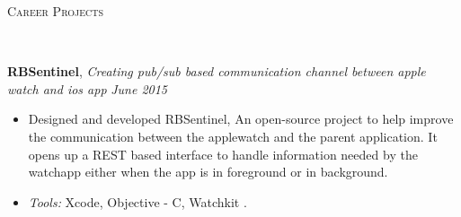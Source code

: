 \documentclass[9pt]{article}
\newenvironment{changemargin}[2]{%
  \begin{list}{}{%
    \setlength{\topsep}{0pt}%
    \setlength{\leftmargin}{#1}%
    \setlength{\rightmargin}{#2}%
    \setlength{\listparindent}{\parindent}%
    \setlength{\itemindent}{\parindent}%
    \setlength{\parsep}{\parskip}%
  }%
  \item[]}{\end{list}
}
\newcommand{\lineover}{
	\begin{changemargin}{-0.05in}{-0.05in}
		\vspace*{-8pt}
		\hrulefill \\
		\vspace*{-2pt}
	\end{changemargin}
}
\newcommand{\header}[1]{
	\begin{changemargin}{-0.5in}{-0.5in}
		\scshape{#1}\\
  	\lineover
	\end{changemargin}
}
\newenvironment{body} {
	\vspace*{-16pt}
	\begin{changemargin}{-0.25in}{-0.5in}
  }	
	{\end{changemargin}
}
\begin{document}
\header{Career Projects}

\begin{body}
	\vspace{14pt}
\textbf {RBSentinel}, \emph{Creating pub/sub based communication channel between apple watch and ios app} \hfill \emph{June 2015}\\
	\vspace*{-4pt}
	\begin{itemize} \itemsep -0pt
	\item Designed and developed RBSentinel, An open-source project to help improve the communication between the applewatch and the parent application. It opens up a REST based interface to handle information needed by the watchapp either when the app is in foreground or in background.
	\item \emph{Tools:} Xcode, Objective - C, Watchkit .
\end{itemize}


\end{body}
\end{document}
